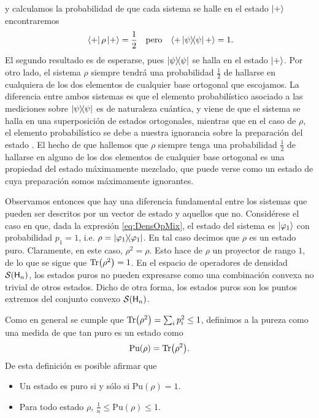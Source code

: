 y calculamos la probabilidad de que cada sistema se halle en el estado $\ket{+}$ encontraremos
\begin{align}
    \bra{+}\rho\ket{+}=\frac{1}{2} && \text{pero} &&\langle + \dyad{\psi} +\rangle=1\rlap{.}\nonumber
\end{align}
El segundo resultado es de esperarse, pues $\dyad{\psi}$ se halla en el estado $\ket{+}$. Por otro lado, el sistema $\rho$ siempre tendrá una probabilidad $\frac{1}{2}$ de hallarse en cualquiera de los dos elementos de cualquier base ortogonal que escojamos. La diferencia entre ambos sistemas es que el elemento probabilístico asociado a las mediciones sobre $\dyad{\psi}$ es de naturaleza cuántica, y viene de que el sistema se halla en una superposición de estados ortogonales, mientras que en el caso de $\rho$, el elemento probabilístico se debe a nuestra ignorancia sobre la preparación del estado \cite{Chuang}. El hecho de que hallemos que $\rho$ siempre tenga una probabilidad $\frac{1}{2}$ de hallarse en alguno de los dos elementos de cualquier base ortogonal es una propiedad del estado máximamente mezclado, que puede verse como un estado de cuya preparación somos máximamente ignorantes.



Observamos entonces que hay una diferencia fundamental entre los sistemas que pueden ser descritos por un vector de estado y aquellos que no. Considérese el caso en que, dada la expresión \ref{eq:DensOpMix}, el estado del sistema es $\ket{\varphi_{1}}$ con  probabilidad $p_{1}=1$, i.e. $\rho=\dyad{\varphi_{1}}$. En tal caso decimos que $\rho$ es un estado puro. Claramente, en este caso, $\rho^{2}=\rho$. Esto hace de $\rho$ un proyector de rango $1$, de lo que se sigue que $\Tr(\rho^{2})=1$. En el espacio de operadores de densidad $\mathcal{S}({\sf H}_{n})$, los estados puros no pueden expresarse como una combinación convexa no trivial de otros estados. Dicho de otra forma, los estados puros son los puntos extremos del conjunto convexo $\mathcal{S}({\sf H}_{n})$.

Como en general se cumple que $\Tr(\rho^{2})=\sum_i p^2_i\leq 1$, definimos a la pureza como una medida de que tan puro es un estado como \cite{Jaeger}
\begin{equation}
    \text{Pu}(\rho)=\Tr(\rho^{2}).\nonumber
\end{equation}
De esta definición es posible afirmar que
\begin{itemize}
    \item Un estado es puro si y sólo si $\text{Pu}(\rho)=1$.
    \item Para todo estado $\rho$, $\frac{1}{n}\leq \text{Pu}(\rho)\leq 1$.
\end{itemize}

